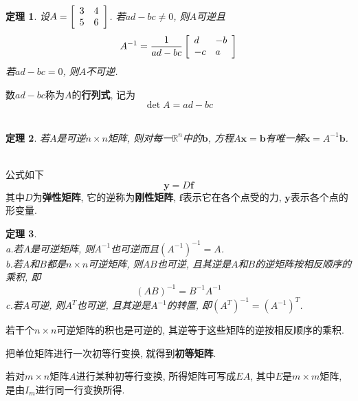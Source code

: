 \documentclass[UTF8,fontset=ubuntu]{ctexart}
\theoremstyle{plain}
\newtheorem{theorem}{定理}
\theoremstyle{nonumberplain}
\theoremstyle{empty}
\begin{document}
\begin{theorem}
设$A=\left[\begin{array}{r r}3 & 4\\5 & 6\end{array}\right]$. 若$ad-bc\neq 0$, 则$A$可逆且
\[A^{-1}=\frac{1}{ad-bc}\left[\begin{array}{l l}d & -b\\-c & a\end{array}\right]\]
若$ad-bc=0$, 则$A$不可逆.
\end{theorem}\vspace{2ex}

数$ad-bc$称为$A$的\textbf{行列式}, 记为
\[\det A=ad-bc\]\\

\begin{theorem}
若$A$是可逆$n\times n$矩阵, 则对每一$\mathbb{R}^n$中的$\bm{b}$, 方程$A\bm{x}=\bm{b}$有唯一解$\bm{x}=A^{-1}\bm{b}$.
\end{theorem}\vspace{2ex}

\begin{law}[胡克定律]\ \\
公式如下
\[\bm{y}=D\bm{f}\]
其中$D$为\textbf{弹性矩阵}, 它的逆称为\textbf{刚性矩阵}, $\bm{f}$表示它在各个点受的力, $\bm{y}$表示各个点的形变量.
\end{law}\vspace{2ex}

\begin{theorem}\ \\
a.若$A$是可逆矩阵, 则$A^{-1}$也可逆而且$(A^{-1})^{-1}=A$.\\
b.若$A$和$B$都是$n\times n$可逆矩阵, 则$AB$也可逆, 且其逆是$A$和$B$的逆矩阵按相反顺序的乘积, 即
\[(AB)^{-1}=B^{-1}A^{-1}\]
c.若$A$可逆, 则$A^T$也可逆, 且其逆是$A^{-1}$的转置, 即$(A^T)^{-1}=(A^{-1})^T$.
\end{theorem}\vspace{2ex}

\begin{law}
若干个$n\times n$可逆矩阵的积也是可逆的, 其逆等于这些矩阵的逆按相反顺序的乘积.
\end{law}\vspace{2ex}

把单位矩阵进行一次初等行变换, 就得到\textbf{初等矩阵}.\\[2ex]

\begin{law}
若对$m\times n$矩阵$A$进行某种初等行变换, 所得矩阵可写成$EA$, 其中$E$是$m\times m$矩阵, 是由$I_m$进行同一行变换所得.
\end{law}\vspace{2ex}
\end{document}
